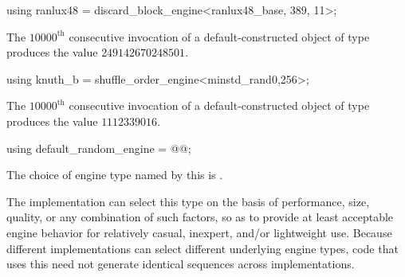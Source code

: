 %
\begin{itemdecl}
using ranlux48 = discard_block_engine<ranlux48_base, 389, 11>;
\end{itemdecl}

\begin{itemdescr}
\pnum
\required
 The $10000^\text{th}$ consecutive invocation
 of a default-constructed object
 of type 
 produces the value
 $249142670248501$.
\end{itemdescr}

%
\begin{itemdecl}
using knuth_b = shuffle_order_engine<minstd_rand0,256>;
\end{itemdecl}

\begin{itemdescr}
\pnum
\required
 The $10000^\text{th}$ consecutive invocation
 of a default-constructed object
 of type 
 produces the value $1112339016$.
\end{itemdescr}%

%
\begin{itemdecl}
using default_random_engine = @\textit{}@;
\end{itemdecl}

\begin{itemdescr}
\pnum
\remarks
The choice of engine type
named by this 
is .
\begin{note}
 The implementation
 can select this type
 on the basis of performance,
 size,
 quality,
 or any combination of such factors,
 so as to provide at least acceptable engine behavior
 for relatively casual, inexpert, and/or lightweight use.
 Because different implementations
 can select different underlying engine types,
 code that uses this 
 need not generate identical sequences across implementations.
\end{note}
\end{itemdescr}%
%
%




